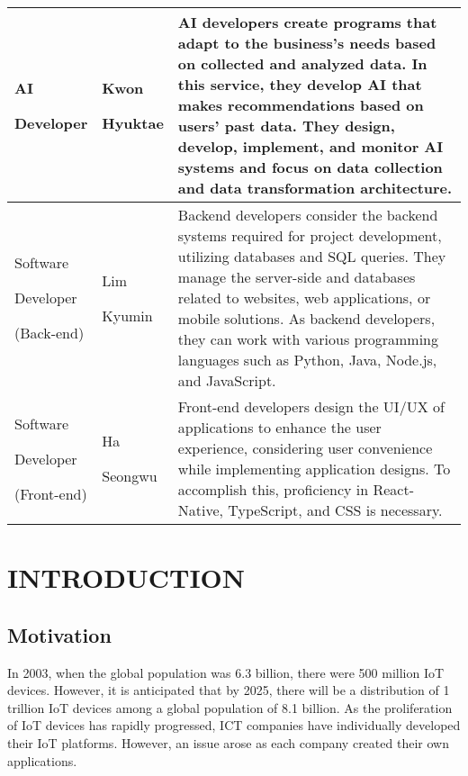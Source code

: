 \documentclass[conference]{IEEEtran}
\begin{document}
\begin{table}
\def\arraystretch{1.24} \small
    \begin{tabular}{|p{1.8cm}|p{1.4cm}|p{4.4cm}|}
        \hline
        AI \par Developer & Kwon \par Hyuktae  & AI developers create programs that adapt to the business's needs based on collected and analyzed data. In this service, they develop AI that makes recommendations based on users' past data. They design, develop, implement, and monitor AI systems and focus on data collection and data transformation architecture. \\ \hline
        
        Software \par Developer \par(Back-end) & Lim \par Kyumin & Backend developers consider the backend systems required for project development, utilizing databases and SQL queries. They manage the server-side and databases related to websites, web applications, or mobile solutions. As backend developers, they can work with various programming languages such as Python, Java, Node.js, and JavaScript. \\ \hline
        
       Software \par Developer\par(Front-end) & Ha \par Seongwu & Front-end developers design the UI/UX of applications to enhance the user experience, considering user convenience while implementing application designs. To accomplish this, proficiency in React-Native, TypeScript, and CSS is necessary.
 \\ \hline
    \end{tabular}
\end{table}


\section{INTRODUCTION}

\subsection{Motivation}
In 2003, when the global population was 6.3 billion, there were 500 million IoT devices. However, it is anticipated that by 2025, there will be a distribution of 1 trillion IoT devices among a global population of 8.1 billion. As the proliferation of IoT devices has rapidly progressed, ICT companies have individually developed their IoT platforms. However, an issue arose as each company created their own applications.
\end{document}
